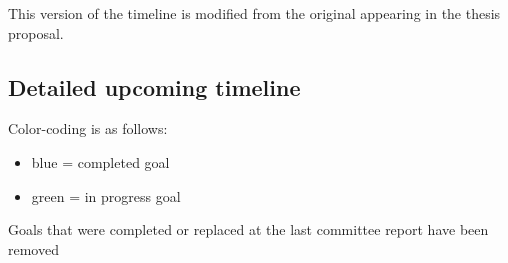 \documentclass[11pt]{article}
\begin{document}
This version of the timeline is modified from the original appearing in the thesis proposal. 

\subsection*{Detailed upcoming timeline}
Color-coding is as follows:
    
    \begin{itemize}
    	\item {\color{RoyalBlue}blue} = completed goal
    	\item {\color{ForestGreen} green} = in progress goal
    \end{itemize}

Goals that were completed or replaced at the last committee report have been removed
\end{document}
